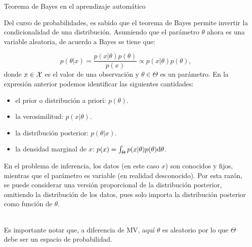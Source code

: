 \documentclass[9pt]{beamer}
\begin{document}
\begin{frame}{Teorema de Bayes en el aprendizaje automático}

Del curso de probabilidades, es sabido que el teorema de Bayes permite invertir la condicionalidad de una distribución. Asumiendo que el parámetro $\theta$ ahora es una variable aleatoria, de acuerdo a Bayes se tiene que:

\begin{equation*}
	p(\theta|x) = \frac{p(x|\theta)p(\theta)}{p(x)} \propto p(x|\theta)p(\theta),\label{eq:Bayes}
\end{equation*}
donde $x\in{\mathcal X}$ es el valor de una observación y $\theta\in\Theta$ es un parámetro. \pause En la expresión anterior podemos identificar las siguientes cantidades:
\begin{itemize}
	\item el prior o distribución a priori: $p(\theta)$. \pause
	\item la verosimilitud: $p(x|\theta)$. \pause
	\item la distribución posterior: $p(\theta|x)$. \pause
	\item la densidad marginal de $x$: $p(x) = \int_\Theta p(x|\theta)p(\theta){\text d}\theta$. \pause
\end{itemize} 

En el problema de inferencia, los datos (en este caso $x$) son conocidos y fijos, mientras que el parámetro es variable (en realidad desconocido). Por esta razón, se puede considerar una versión proporcional de la distribución posterior, omitiendo la distribución de los datos, pues solo importa la distribución posterior como función de $\theta$.\\~\ \pause

Es importante notar que, a diferencia de MV, aquí $\theta$ es aleatorio por lo que $\Theta$ debe ser un espacio de probabilidad.
\end{frame}
\end{document}

